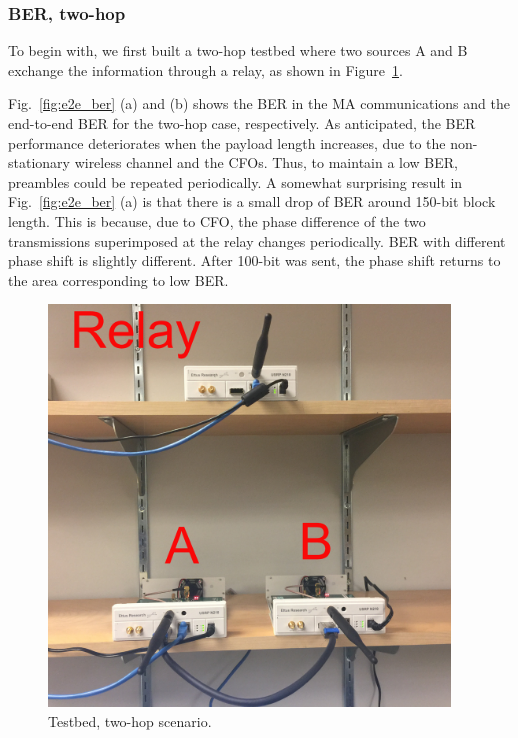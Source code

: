 \subsubsection{BER, two-hop}
To begin with, we first built a two-hop testbed where two sources A and B exchange the information through a relay, as shown in Figure~\ref{fig:twohoptestbed}. 

Fig.~\ref{fig:e2e_ber} (a) and (b) shows the BER in the MA communications and the end-to-end BER for the two-hop case, respectively. As anticipated, the BER performance deteriorates when the payload length increases, due to the non-stationary wireless channel and the CFOs. Thus, to maintain a low BER,  preambles could be repeated periodically.
A somewhat surprising result in Fig.~\ref{fig:e2e_ber} (a) is that there is a small drop of BER around 150-bit block length. This is because, due to CFO, the phase difference of the two transmissions superimposed at the relay changes periodically. BER with different phase shift is slightly different. After 100-bit was sent, the phase shift returns to the area corresponding to low BER.  %

\begin{figure} [th]
    \centering
    \includegraphics[width=0.95\textwidth]{figures/testbed}
    \caption{Testbed, two-hop scenario.}\label{fig:twohoptestbed}
\end{figure}

